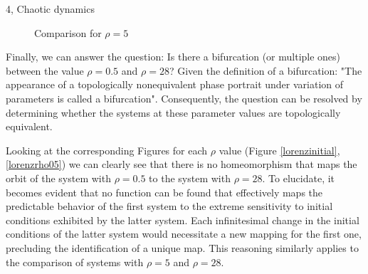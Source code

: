 \begin{task}{4, Chaotic dynamics}
\begin{figure}[H]
\centering
{}
\caption{Comparison for \(\rho = 5\)}
\label{lorenzrho5}
\end{figure}

Finally, we can answer the question: Is there a bifurcation (or multiple ones) between the value \(\rho = 0.5\) and \(\rho = 28\)? Given the definition of a bifurcation: "The appearance of a topologically nonequivalent phase portrait under variation of parameters is called a bifurcation". Consequently, the question can be resolved by determining whether the systems at these parameter values are topologically equivalent. 

Looking at the corresponding Figures for each \(\rho\) value (Figure \ref{lorenzinitial}, \ref{lorenzrho05}) we can clearly see that there is no homeomorphism that maps the orbit of the system with \(\rho = 0.5\) to the system with \(\rho = 28\). To elucidate, it becomes evident that no function can be found that effectively maps the predictable behavior of the first system to the extreme sensitivity to initial conditions exhibited by the latter system. Each infinitesimal change in the initial conditions of the latter system would necessitate a new mapping for the first one, precluding the identification of a unique map. This reasoning similarly applies to the comparison of systems with \(\rho = 5\) and \(\rho = 28\).
\end{task}